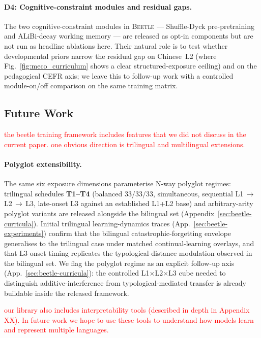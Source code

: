 \documentclass[11pt]{article}
\begin{document}
\paragraph{D4: Cognitive-constraint modules and residual gaps.} The two cognitive-constraint modules in \textsc{Beetle} --- Shuffle-Dyck pre-pretraining \citep{hu2025between} and ALiBi-decay working memory \citep{mita2025wm, madhayastha2026wm} --- are released as opt-in components but are not run as headline ablations here. Their natural role is to test whether developmental priors narrow the residual gap on Chinese~L2 (where Fig.~\ref{fig:meco_curriculum} shows a clear structured-exposure ceiling) and on the pedagogical CEFR axis; we leave this to follow-up work with a controlled module-on/off comparison on the same training matrix.

\subsection{Future Work}

\textcolor{red}{the beetle training framework includes features that we did not discuss in the current paper. one obvious direction is trilingual and multilingual extensions. }

\paragraph{Polyglot extensibility.} The same six exposure dimensions parameterise N-way polyglot regimes: trilingual schedules \textbf{T1--T4} (balanced 33/33/33, simultaneous, sequential L1\,$\to$\,L2\,$\to$\,L3, late-onset L3 against an established L1+L2 base) and arbitrary-arity polyglot variants are released alongside the bilingual set (Appendix~\ref{sec:beetle-curricula}). Initial trilingual learning-dynamics traces (App.~\ref{sec:beetle-experiments}) confirm that the bilingual catastrophic-forgetting envelope generalises to the trilingual case under matched continual-learning overlays, and that L3 onset timing replicates the typological-distance modulation observed in the bilingual set. We flag the polyglot regime as an explicit follow-up axis (App.~\ref{sec:beetle-curricula}): the controlled L1$\times$L2$\times$L3 cube needed to distinguish additive-interference from typological-mediated transfer is already buildable inside the released framework.

\textcolor{red}{our library also includes interpretability tools (described in depth in Appendix XX). In future work we hope to use these tools to understand how models learn and represent multiple languages.}
\end{document}
